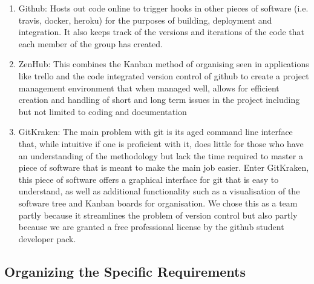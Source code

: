 \documentclass[11pt]{article}
\begin{document}
\begin{enumerate}
	\begin{enumerate}
		\item Github: Hosts out code online to trigger hooks in other pieces of software (i.e. travis, docker, heroku) for the purposes of building, deployment and integration. It also keeps track of the versions and iterations of the code that each member of the group has created.
		\item ZenHub: This combines the Kanban method of organising seen in applications like trello and the code integrated version control of github to create a project management environment that when managed well, allows for efficient creation and handling of short and long term issues in the project including but not limited to coding and documentation
		\item GitKraken: The main problem with git is its aged command line interface that, while intuitive if one is proficient with it, does little for those who have an understanding of the methodology but lack the time required to master a piece of software that is meant to make the main job easier. Enter GitKraken, this piece of software offers a graphical interface for git that is easy to understand, as well as additional functionality such as a visualisation of the software tree and Kanban boards for organisation. We chose this as a team partly because it streamlines the problem of version control but also partly because we are granted a free professional license by the github student developer pack.
	\end{enumerate}
\end{enumerate}

\subsection{Organizing the Specific Requirements}

\end{document}
